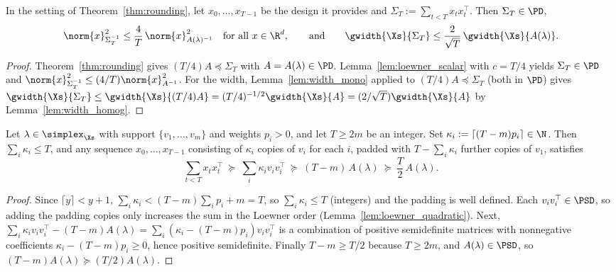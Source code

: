 \begin{corollary}\label{cor:fixed_design_from_distribution}
\leanok
{}
In the setting of Theorem~\ref{thm:rounding}, let $x_0,\dots,x_{T-1}$ be the design it provides
and $\Sigma_T := \sum_{t<T}x_tx_t^\top$. Then $\Sigma_T \in \PD$,
\[
  \norm{x}_{\Sigma_T^{-1}}^2 \le \frac 4T\,\norm{x}_{A(\lambda)^{-1}}^2 \quad\text{for all } x \in \R^d,
  \qquad\text{and}\qquad
  \gwidth{\Xs}{\Sigma_T} \le \frac{2}{\sqrt T}\,\gwidth{\Xs}{A(\lambda)} .
\]
\end{corollary}

\begin{proof}
\leanok
{}
Theorem~\ref{thm:rounding} gives $(T/4)A \preceq \Sigma_T$ with $A = A(\lambda) \in \PD$.
Lemma~\ref{lem:loewner_scalar} with $c = T/4$ yields $\Sigma_T \in \PD$ and
$\norm{x}_{\Sigma_T^{-1}}^2 \le (4/T)\norm{x}_{A^{-1}}^2$. For the width,
Lemma~\ref{lem:width_mono} applied to $(T/4)A \preceq \Sigma_T$ (both in $\PD$) gives
$\gwidth{\Xs}{\Sigma_T} \le \gwidth{\Xs}{(T/4)A} = (T/4)^{-1/2}\gwidth{\Xs}{A} =
(2/\sqrt T)\gwidth{\Xs}{A}$ by Lemma~\ref{lem:width_homog}.
\end{proof}

\begin{lemma}\label{lem:naive_rounding}
Let $\lambda \in \simplex_{\Xs}$ with support $\{v_1,\dots,v_m\}$ and weights $p_i > 0$, and let
$T \ge 2m$ be an integer. Set $\kappa_i := \lceil (T-m)p_i \rceil \in \N$. Then
$\sum_i\kappa_i \le T$, and any sequence $x_0,\dots,x_{T-1}$ consisting of $\kappa_i$ copies of
$v_i$ for each $i$, padded with $T - \sum_i\kappa_i$ further copies of $v_1$, satisfies
\[
  \sum_{t<T}x_tx_t^\top \ \succeq\ \sum_i\kappa_iv_iv_i^\top \ \succeq\ (T-m)\,A(\lambda) \ \succeq\ \frac T2\,A(\lambda) .
\]
\end{lemma}

\begin{proof}
Since $\lceil y\rceil < y + 1$, $\sum_i\kappa_i < (T-m)\sum_ip_i + m = T$, so $\sum_i\kappa_i \le T$
(integers) and the padding is well defined. Each $v_iv_i^\top \in \PSD$, so adding the padding
copies only increases the sum in the Loewner order (Lemma~\ref{lem:loewner_quadratic}). Next,
$\sum_i\kappa_iv_iv_i^\top - (T-m)A(\lambda) = \sum_i(\kappa_i - (T-m)p_i)v_iv_i^\top$ is a
combination of positive semidefinite matrices with nonnegative coefficients
$\kappa_i - (T-m)p_i \ge 0$, hence positive semidefinite. Finally $T - m \ge T/2$ because
$T \ge 2m$, and $A(\lambda) \in \PSD$, so $(T-m)A(\lambda) \succeq (T/2)A(\lambda)$.
\end{proof}

